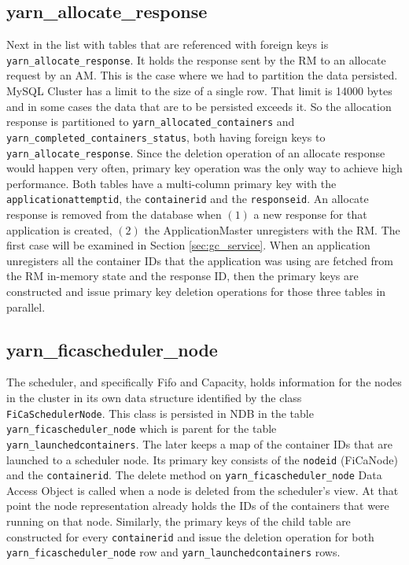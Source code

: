 \subsection{yarn\_allocate\_response}
\label{ssec:impl_fk_alloc_resp}
Next in the list with tables that are referenced with foreign keys is
\texttt{yarn\_allocate\_response}. It holds the response sent by the
RM to an allocate request by an AM. This is the case where we had to
partition the data persisted. MySQL Cluster has a limit to the size of
a single row. That limit is 14000 bytes \cite{ndb_row_limit} and in
some cases the data that are to be persisted exceeds it. So the
allocation response is partitioned to
\texttt{yarn\_allocated\_containers} and
\texttt{yarn\_completed\_containers\_status}, both having foreign keys
to \texttt{yarn\_allocate\_response}. Since the deletion operation of
an allocate response would happen very often, primary key operation
was the only way to achieve high performance. Both tables have a
multi-column primary key with the \texttt{applicationattemptid}, the
\texttt{containerid} and the \texttt{responseid}. An allocate response
is removed from the database when $(1)$ a new response for that
application is created, $(2)$ the ApplicationMaster unregisters with
the RM. The first case will be examined in Section
\ref{sec:gc_service}. When an application unregisters all the
container IDs that the application was using are fetched from the RM in-memory
state and the response ID,
then the primary keys are constructed and issue primary key deletion
operations for those three tables in parallel.

\subsection{yarn\_ficascheduler\_node}
\label{ssec:impl_fk_fica_node}
The scheduler, and specifically Fifo and Capacity, holds information for the nodes in the cluster in its
own data structure identified by the class \texttt{FiCaSchedulerNode}. This
class is persisted in NDB in the table
\texttt{yarn\_ficascheduler\_node} which is parent for the table
\texttt{yarn\_launchedcontainers}. The later keeps a map of the
container IDs that are launched to a scheduler node. Its primary key
consists of the \texttt{nodeid} (FiCaNode) and the
\texttt{containerid}. The delete method on
\texttt{yarn\_ficascheduler\_node} Data Access Object is called when a
node is deleted from the scheduler's view. At that point the node
representation already holds the IDs of the containers that were
running on that node. Similarly, the primary keys of the child table are constructed
for every \texttt{containerid} and issue the deletion operation for both
\texttt{yarn\_ficascheduler\_node} row and
\texttt{yarn\_launchedcontainers} rows.

